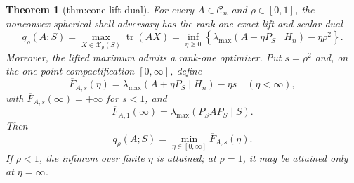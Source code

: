 \documentclass{article}
\newtheorem{theorem}{Theorem}
\begin{document}
\begin{theorem}[thm:cone-lift-dual]\label{thm:cone-lift-dual}
For every \(A\in\mathcal C_n\) and \(\rho\in[0,1]\), the nonconvex spherical-shell adversary has the rank-one-exact lift and scalar dual
\[
q_\rho(A;S)=\max_{X\in\mathcal X_\rho(S)}\operatorname{tr}(AX)
=\inf_{\eta\geq0}\left\{\lambda_{\max}(A+\eta P_S\mid H_n)-\eta\rho^2\right\}.
\]
Moreover, the lifted maximum admits a rank-one optimizer. Put \(s=\rho^2\) and, on the one-point compactification \([0,\infty]\), define
\[
\overline F_{A,s}(\eta)=\lambda_{\max}(A+\eta P_S\mid H_n)-\eta s
\quad(\eta<\infty),
\]
with \(\overline F_{A,s}(\infty)=+\infty\) for \(s<1\), and
\[
\overline F_{A,1}(\infty)=\lambda_{\max}(P_SAP_S\mid S).
\]
Then
\[
q_\rho(A;S)=\min_{\eta\in[0,\infty]}\overline F_{A,s}(\eta).
\]
If \(\rho<1\), the infimum over finite \(\eta\) is attained; at \(\rho=1\), it may be attained only at \(\eta=\infty\).
\end{theorem}
\end{document}
